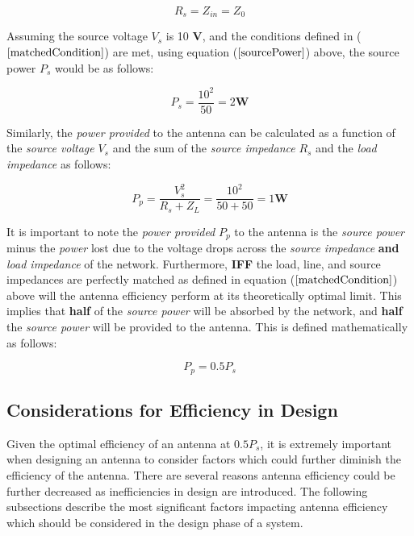 \documentclass{article}
\begin{document}
\begin{equation}\label{matchedCondition}
    R_s = Z_{in} = Z_0
\end{equation}

Assuming the source voltage $V_s$ is 10 \textbf{V}, and the conditions defined in ($\ref{matchedCondition}$) are met, using equation ($\ref{sourcePower}$) above, the source power $P_s$ would be as follows:

\begin{equation*}
    P_s = \dfrac{10^2}{50} = 2 \textbf{W}
\end{equation*}

Similarly, the \textit{power provided} to the antenna can be calculated as a function of the \textit{source voltage} $V_s$ and the sum of the \textit{source impedance} $R_s$ and the \textit{load impedance} as follows:

\begin{equation}\label{powerProvided}
    P_p = \dfrac{V_s^2}{R_s + Z_L} = \dfrac{10^2}{50 + 50} = 1 \textbf{W}
\end{equation}

It is important to note the \textit{power provided} $P_p$ to the antenna is the \textit{source power} minus the \textit{power} lost due to the voltage drops across the \textit{source impedance} \textbf{and} \textit{load impedance} of the network. Furthermore, \textbf{IFF} the load, line, and source impedances are perfectly matched as defined in equation ($\ref{matchedCondition}$) above will the antenna efficiency perform at its theoretically optimal limit. This implies that \textbf{half} of the \textit{source power} will be absorbed by the network, and \textbf{half} the \textit{source power} will be provided to the antenna. This is defined mathematically as follows:

\begin{equation*}
    P_p = 0.5P_s
\end{equation*}

\subsection{Considerations for Efficiency in Design}
Given the optimal efficiency of an antenna at $0.5P_s$, it is extremely important when designing an antenna to consider factors which could further diminish the efficiency of the antenna. There are several reasons antenna efficiency could be further decreased as inefficiencies in design are introduced. The following subsections describe the most significant factors impacting antenna efficiency which should be considered in the design phase of a system.
\end{document}
